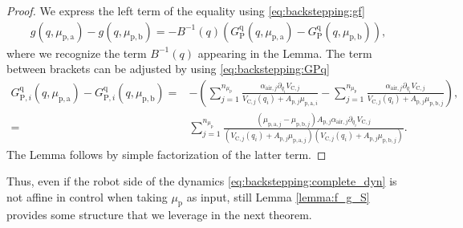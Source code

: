 %
\begin{proof}
	We express the left term of the equality using \eqref{eq:backstepping:gf}
	\begin{equation*}%
	\begin{split}
	g(q,\mu_{\mathrm{p},\mathrm{a}}) - g(q,\mu_{\mathrm{p},\mathrm{b}}) 
	=-B^{-1}(q) (G_{\mathrm{P}}^{\mathrm{q}}(q,\mu_{\mathrm{p},\mathrm{a}}) - G_{\mathrm{P}}^{\mathrm{q}}(q,\mu_{\mathrm{p},\mathrm{b}})),
	\end{split}
	\end{equation*}
	where we recognize the term $B^{-1}(q)$ appearing in the Lemma. The term between brackets can be adjusted by using \eqref{eq:backstepping:GPq}
	\begin{equation}
	\begin{split}
		G_{\mathrm{P},i}^{\mathrm{q}}(q,\mu_{\mathrm{p},\mathrm{a}}) - G_{\mathrm{P},i}^{\mathrm{q}}(q,\mu_{\mathrm{p},\mathrm{b}}) = &-\left(\sum_{j = 1}^{n_{\mu_\mathrm{p}}}  \frac{\alpha_{\mathrm{air},j} \partial_{q_i}V_{\mathrm{C},j}}{V_{\mathrm{C},j}(q_i) + A_{\mathrm{p},j} \mu_{\mathrm{p},\mathrm{a},i}} \!-\! \sum_{j = 1}^{n_{\mu_\mathrm{p}}}  \frac{\alpha_{\mathrm{air},j} \partial_{q_i}V_{\mathrm{C},j}}{V_{\mathrm{C},j}(q_i) + A_{\mathrm{p},j} \mu_{\mathrm{p},\mathrm{b},j}}\right),  \\
	= &\sum_{j = 1}^{n_{\mu_\mathrm{p}}} \frac{ (\mu_{\mathrm{p},\mathrm{a},j} - \mu_{\mathrm{p},\mathrm{b},j})  A_{\mathrm{p},j} \alpha_{\mathrm{air},j} \partial_{q_i}V_{\mathrm{C},j}}{(V_{\mathrm{C},j}(q_i) + A_{\mathrm{p},j} \mu_{\mathrm{p},\mathrm{a},j})(V_{\mathrm{C},j}(q_i) + A_{\mathrm{p},j} \mu_{\mathrm{p},\mathrm{b},j})}.
	\end{split}
	\end{equation}
	The Lemma follows by simple factorization of the latter term.
\end{proof}

Thus, even if the robot side of the dynamics \eqref{eq:backstepping:complete_dyn} is not affine in control when taking $\mu_\mathrm{p}$ as input, still Lemma \ref{lemma:f_g_S} provides some structure that we leverage in the next theorem.

